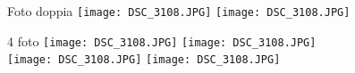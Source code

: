 \documentclass{beamer}
\begin{document}
\begin{frame}{Foto doppia}
    \centering
    \texttt{[image: DSC\_3108.JPG]}
    \texttt{[image: DSC\_3108.JPG]}
\end{frame}

\begin{frame}{4 foto}
    \centering
    \texttt{[image: DSC\_3108.JPG]}
    \pause \texttt{[image: DSC\_3108.JPG]} \\
    \pause \texttt{[image: DSC\_3108.JPG]}
    \pause \texttt{[image: DSC\_3108.JPG]}
\end{frame}
\end{document}
